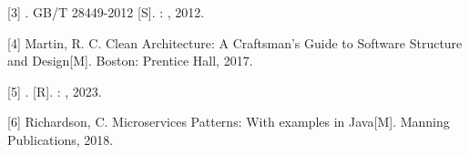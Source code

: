 {[}3{]} . GB/T 28449-2012 {[}S{]}. : , 2012.

{[}4{]} Martin, R. C. Clean Architecture: A Craftsman's Guide to
Software Structure and Design{[}M{]}. Boston: Prentice Hall, 2017.

{[}5{]} . {[}R{]}. : , 2023.

{[}6{]} Richardson, C. Microservices Patterns: With examples in
Java{[}M{]}. Manning Publications, 2018.

\hypertarget{section-8}{%
\subsection{}\label{section-8}}

\hypertarget{section-9}{%
\subsubsection{}\label{section-9}}

